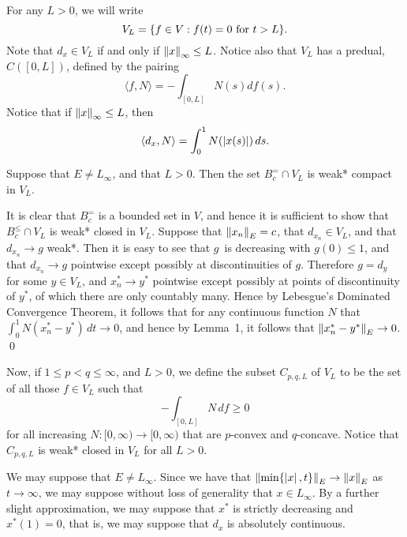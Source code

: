 For any $L>0$, we will write
$$ V_L = \{ f \in V : f(t) = 0 \hbox{ for $t > L$}\}. $$
Note that $d_x \in V_L$ if and only if $\left\|x\right\|_\infty \le L$.  Notice
also that $V_L$ has a predual, $C([0,L])$, defined by the pairing
$$ \langle f,N \rangle = - \int_{[0,L]} N(s) df(s) .$$
Notice that if $\left\|x\right\|_\infty \le L$, then
$$ \langle d_x, N \rangle = \int_0^1 N(\left|x(s)\right|) \, ds .$$

  Suppose that $E \ne L_\infty$, and that $L>0$.
Then the set $B_c^= \cap V_L$ is weak* compact in $V_L$.
\endproclaim

  It is clear that $B_c^=$ is a bounded set in $V$, and
hence it is sufficient to show that $B_c^\le \cap V_L$ is weak* closed
in $V_L$.
Suppose that $\left\|x_n\right\|_E = c$, that $d_{x_n} \in V_L$, and that
$d_{x_n} \to g$ weak*.
Then it is easy to see that $g$\ is decreasing with $g(0) \le 1$, and that
$d_{x_n} \to g$ pointwise except possibly at discontinuities of $g$.
Therefore $g = d_y$ for
some $y \in V_L$, and
$x_n^* \to y^*$ pointwise except possibly at points of
discontinuity of $y^*$, of which there are only countably many.
Hence by Lebesgue's Dominated Convergence Theorem, it
follows that for any continuous function $N$ that
$\int_0^1 N(x_n^* - y^*) \, dt \to 0$,
and hence by Lemma~1, it follows that $\left\|x^*_n-y^*\right\|_E
\to 0$.
\qed
\enddemo

Now, if $1 \le p < q \le \infty$, and $L>0$, we define the subset
$C_{p,q,L}$ of
$V_L$ to be the set of all those $f \in V_L$ such that
$$ -\int_{[0,L]} N \, df \ge 0 $$
for all increasing $N:[0,\infty) \to [0,\infty)$
that are $p$-convex and $q$-concave.
Notice that $C_{p,q,L}$ is weak* closed in
$V_L$ for all $L > 0$.

\bigskip

We may suppose that $E \ne L_\infty$.
Since we have that $\left\|\min\{\left|x\right|,t\}\right\|_E 
 \to \left\|x\right\|_E$ as $t\to\infty$, we may
suppose without loss of generality that $x \in L_\infty$.  By a further
slight approximation, we may suppose that $x^*$ is strictly decreasing
and $x^*(1) = 0$, that is, we may suppose that $d_x$ is absolutely
continuous.

